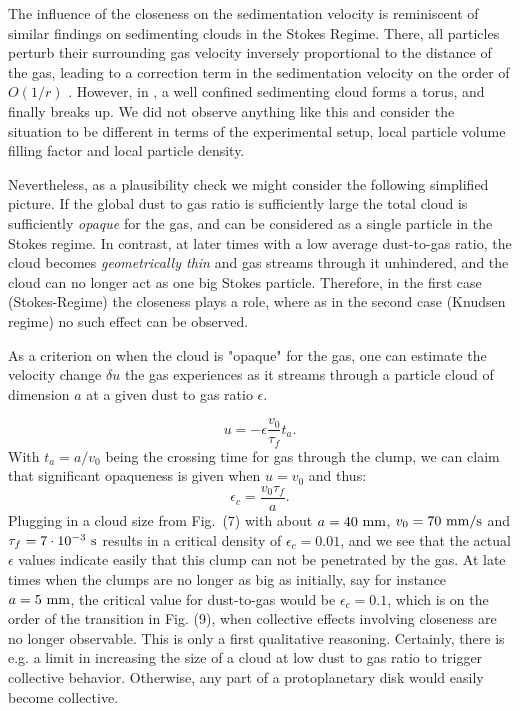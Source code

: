 {
The influence of the closeness on the sedimentation velocity is reminiscent of similar findings on sedimenting clouds in the Stokes Regime. There, all particles perturb their surrounding gas velocity inversely proportional to the distance of the gas, leading to a correction term in the sedimentation velocity on the order of $O(1/r)$ \citep{GUAZZELLI2006539}. However, in \citet{GUAZZELLI2006539}, a well confined sedimenting cloud forms a torus, and finally breaks up. We did not observe anything like this and consider the situation to be different {in terms of the experimental setup, local particle volume filling factor and local particle density}. 

Nevertheless, as a plausibility check we might consider the following simplified picture. 
If the global dust to gas ratio is sufficiently large the total cloud is sufficiently {\em opaque} for the gas, and can be considered as a single particle in the Stokes regime. In contrast, at later times with a low average dust-to-gas ratio, the cloud becomes {\em geometrically thin} and gas streams through it unhindered, and the cloud can no longer act as one big Stokes particle. Therefore, in the first case (Stokes-Regime) the closeness plays a role, where as in the second case (Knudsen regime) no such effect can be observed. 

As a criterion on when the cloud is "opaque" for the gas, one can estimate the velocity change $\delta u$ the gas experiences as it streams through a particle cloud of dimension $a$ at a given dust to gas ratio $\epsilon$.
 }
\begin{equation}
u = - \epsilon \frac{v_0}{\tau_f} t_a.
\end{equation}
With $t_a = a / v_0$ being the crossing time for gas through the clump, we can claim that significant opaqueness is given when $u = v_0$
and thus:
\begin{equation}
\epsilon_c  = \frac{v_0 \tau_f}{a}.
\end{equation}
{Plugging in a cloud size from Fig.\ (7) with about $a=40~\rm mm$, $v_0 = 70~\rm mm/s$ and $\tau_f = 7\cdot 10^{-3}~\rm s$ results in a critical density of $\epsilon_c = 0.01$, and we see that the actual $\epsilon$ values indicate easily that this clump can not be penetrated by the gas. 
At late times when the clumps are no longer as big as initially, say for instance $a = 5~\rm mm$, the critical  value for dust-to-gas would be $\epsilon_c = 0.1$, which is on the order of the transition in Fig. (9), when collective effects involving closeness are no longer observable. This is only a first qualitative reasoning.
Certainly, there is e.g. a limit in increasing the size of a cloud at low dust to gas ratio to trigger collective behavior. Otherwise, any part of a protoplanetary disk would easily become collective.}

